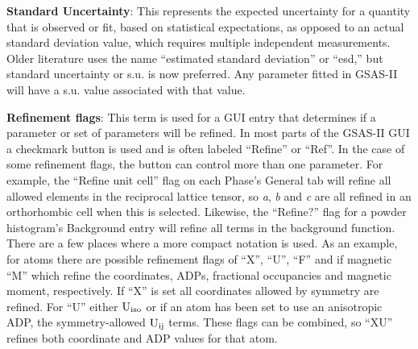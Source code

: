 \textbf{Standard Uncertainty}: This represents the expected uncertainty for a quantity that is observed or fit, based on statistical expectations, as opposed to an actual standard deviation value, which requires multiple independent measurements. Older literature uses the name ``estimated standard deviation'' or ``esd,'' but standard uncertainty or s.u. is now preferred. Any parameter fitted in GSAS-II will have a s.u. value associated with that value. 

\textbf{Refinement flags}: This term is used for a GUI entry that determines if a parameter or set of parameters will be refined. In most parts of the GSAS-II GUI a checkmark button is used and is often labeled ``Refine'' or ``Ref''. In the case of some refinement flags, the button can control more than one parameter. For example, the ``Refine unit cell'' flag on each Phase's General tab will refine all allowed elements in the reciprocal lattice tensor, so \textit{a}, \textit{b} and \textit{c} are all refined in an orthorhombic cell when this is selected. Likewise, the ``Refine?'' flag for a powder histogram's Background entry will refine all terms in the background function. There are a few places where a more compact notation is used. As an example, for atoms there are possible refinement flags of ``X'', ``U'', ``F'' and if magnetic ``M'' which refine the coordinates, ADPs, fractional occupancies and magnetic moment, respectively. If ``X'' is set all coordinates allowed by symmetry are refined. For ``U'' either $\rm U_{iso}$ or if an atom has been set to use an anisotropic ADP, the symmetry-allowed $\rm U_{ij}$ terms. These flags can be combined, so ``XU'' refines both coordinate and ADP values for that atom.

